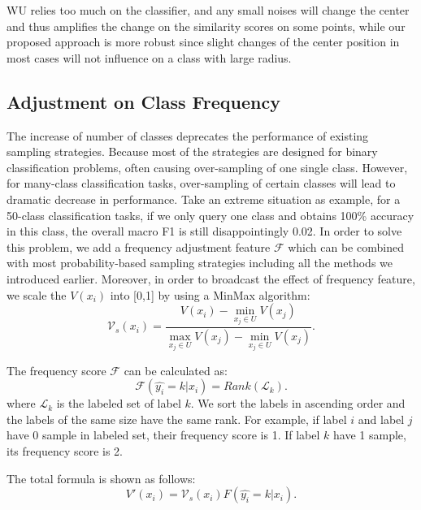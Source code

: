 WU relies too much on the classifier, and any small noises will change the center and thus amplifies the change on the similarity scores on some points, while our proposed approach is more robust since slight changes of the center position in most cases will not influence on a class with large radius.
    
\subsection{Adjustment on Class Frequency}
\label{sec:classfreq}
The increase of number of classes deprecates the performance of
existing sampling strategies. Because most of the strategies are designed 
for binary classification problems, often causing over-sampling of 
one single class. However, for many-class classification tasks, 
over-sampling of certain classes will lead to dramatic decrease in performance. 
Take an extreme situation as example, for a 50-class classification tasks, 
if we only query one class and obtains 100\% accuracy in this class, 
the overall macro F1 is still disappointingly 0.02. 
In order to solve this problem, we add a frequency adjustment feature 
$\mathcal{F}$ which can be combined with most probability-based 
sampling strategies including all the methods we introduced earlier. 
Moreover, in order to broadcast the effect of frequency feature, 
we scale the $V(x_i)$ into [0,1] by using a MinMax algorithm: 
\begin{equation}
	\mathcal{V}_s(x_i) = \frac{V(x_i)-\min_{x_j\in U}V(x_j)}{\max_{x_j\in U}V(x_j) - \min_{x_j\in U}V(x_j)}. 
\end{equation}

The frequency score $\mathcal{F}$ can be calculated as:
\begin{equation}
    \mathcal{F}(\hat{y_i} = k|x_i) = Rank(\mathcal{L}_k).  
\end{equation}
where $\mathcal{L}_k$ is the labeled set of label $k$. We sort the labels in ascending order and the labels of the same size have the same rank. For example, if label $i$ and label $j$ have 0 sample in labeled set, their frequency score is 1. If label $k$ have 1 sample, its frequency score is 2.

The total formula is shown as follows:
\begin{equation}
    V'(x_i) = \mathcal{V}_s(x_i)F(\hat{y_i} = k|x_i).
\end{equation}

